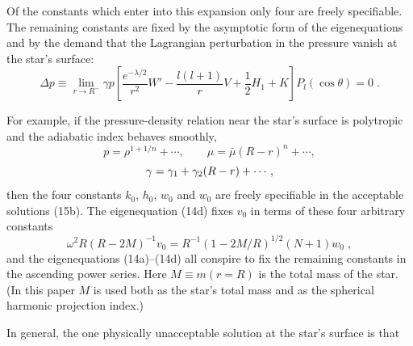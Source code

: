 Of the constants which enter into this expansion only four are freely specifiable. The
remaining constants are fixed by the asymptotic form of the eigenequations and by the
demand that the Lagrangian perturbation in the pressure vanish at the star's surface:
\begin{equation}
  \Delta p \equiv \lim_{r \to R^-} \gamma p \left[
    \frac{e^{-\lambda/2}}{r^2} W' - \frac{l(l+1)}{r} V
    + \frac{1}{2} H_1 + K
  \right] P_l(\cos\theta) = 0\;.
\label{eq:16}
\end{equation}

For example, if the pressure-density relation near the star's surface is polytropic and the
adiabatic index behaves smoothly,
\begin{equation}
  p = \rho^{1+1/n} + \cdots, \qquad \mu = \bar{\mu}(R-r)^n + \cdots,
\label{eq:17a}
\end{equation}
\begin{equation}
  \gamma = \gamma_1 + \gamma_2(R-r) + \cdots,
\notag
\end{equation}
then the four constants $k_0$, $h_0$, $w_0$ and $w_0$ are freely specifiable in the acceptable solutions
(15b). The eigenequation (14d) fixes $v_0$ in terms of these four arbitrary constants
\begin{equation}
  \omega^2 R(R - 2M)^{-1} v_0 = R^{-1}(1 - 2M/R)^{1/2} (N+1) w_0\;,
\label{eq:17b}
\end{equation}
and the eigenequations (14a)--(14d) all conspire to fix the remaining constants in the
ascending power series. Here $M \equiv m(r = R)$ is the total mass of the star. (In this paper
$M$ is used both as the star's total mass and as the spherical harmonic projection index.)

In general, the one physically unacceptable solution at the star's surface is that
